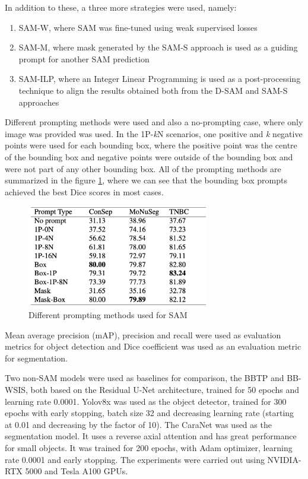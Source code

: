 In addition to these, a three more strategies were used, namely:

\begin{enumerate}
    \item SAM-W, where SAM was fine-tuned using weak supervised losses
    \item SAM-M, where mask generated by the SAM-S approach is used as a guiding prompt for another SAM prediction
    \item SAM-ILP, where an Integer Linear Programming is used as a post-processing technique to align the results obtained both from the D-SAM and SAM-S approaches
\end{enumerate}

Different prompting methods were used and also a no-prompting case, where only image was provided was used. In the 1P-\textit{k}N scenarios, one positive and \textit{k} negative points were used for each bounding box, where the positive point was the centre of the bounding box and negative points were outside of the bounding box and were not part of any other bounding box. All of the prompting methods are summarized in the figure \ref{fig:rw-sam-prompting}, where we can see that the bounding box prompts achieved the best Dice scores in most cases.

\begin{figure}[H]
    \begin{centering}
    \includegraphics[width=8cm]{assets/images/rw-table-prompting.png}
    \par\end{centering}
    \caption{Different prompting methods used for SAM}
    \label{fig:rw-sam-prompting}
\end{figure}

Mean average precision (mAP), precision and recall were used as evaluation metrics for object detection and Dice coefficient was used as an evaluation metric for segmentation.

Two non-SAM models were used as baselines for comparison, the BBTP and BB-WSIS, both based on the Residual U-Net architecture, trained for 50 epochs and learning rate 0.0001. Yolov8x was used as the object detector, trained for 300 epochs with early stopping, batch size 32 and decreasing learning rate (starting at 0.01 and decreasing by the factor of 10). The CaraNet was used as the segmentation model. It uses a reverse axial attention and has great performance for small objects. It was trained for 200 epochs, with Adam optimizer, learning rate 0.0001 and early stopping. The experiments were carried out using NVIDIA-RTX 5000 and Tesla A100 GPUs.

